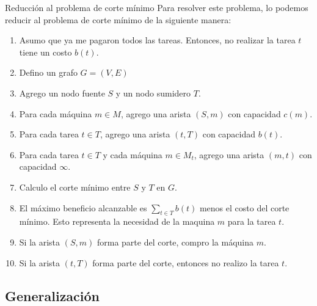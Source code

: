 \documentclass{beamer}
\begin{document}
\begin{frame}{Reducción al problema de corte mínimo}
    Para resolver este problema, lo podemos reducir al problema de corte mínimo de la siguiente manera:
    \pause 
    \begin{enumerate}
        
        \item Asumo que ya me pagaron todos las tareas. Entonces, no realizar la tarea $t$ tiene un costo $b(t)$.
        
        \pause 

        \item Defino un grafo $G = (V,E)$
        \item Agrego un nodo fuente $S$ y un nodo sumidero $T$.
        \item Para cada máquina $m \in M$, agrego una arista $(S,m)$ con capacidad $c(m)$.
        \item Para cada tarea $t \in T$, agrego una arista $(t,T)$ con capacidad $b(t)$.

        \pause
        \item Para cada tarea $t \in T$ y cada máquina $m \in M_t$, agrego una arista $(m,t)$ con capacidad $\infty$.
        
        \pause
        \item Calculo el corte mínimo entre $S$ y $T$ en $G$.
        \item El máximo beneficio alcanzable es $\sum_{t \in T} b(t)$ menos el costo del corte mínimo. Esto representa la necesidad de la maquina $m$ para la tarea $t$.
        
        \pause
        \item Si la arista $(S,m)$ forma parte del corte, compro la máquina $m$.
        \item Si la arista $(t,T)$ forma parte del corte, entonces no realizo la tarea $t$.
    \end{enumerate}    
\end{frame}

\subsection{Generalización}
\end{document}
